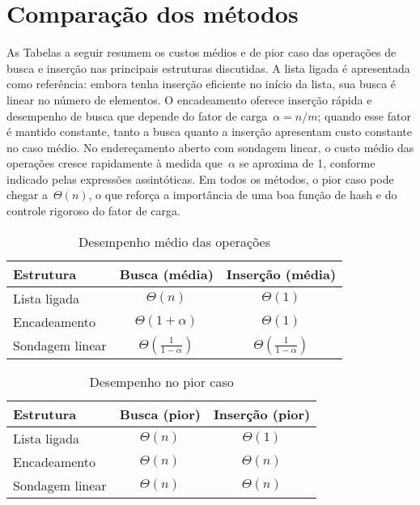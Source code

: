 \section{Comparação dos métodos}

As Tabelas a seguir resumem os custos médios e de pior caso das operações de busca e inserção nas principais estruturas discutidas. 
A lista ligada é apresentada como referência: embora tenha inserção eficiente no início da lista, sua busca é linear no número de elementos. 
O encadeamento oferece inserção rápida e desempenho de busca que depende do fator de carga~$\alpha = n/m$; quando esse fator é mantido constante, tanto a busca quanto a inserção apresentam custo constante no caso médio. 
No endereçamento aberto com sondagem linear, o custo médio das operações cresce rapidamente à medida que~$\alpha$ se aproxima de 1, conforme indicado pelas expressões assintóticas. 
Em todos os métodos, o pior caso pode chegar a~$\Theta(n)$, o que reforça a importância de uma boa função de hash e do controle rigoroso do fator de carga.

\begin{table}[h!]
\centering
\caption{Desempenho médio das operações}
\begin{tabular}{|l|c|c|}
\hline
\textbf{Estrutura} & \textbf{Busca (média)} & \textbf{Inserção (média)} \\
\hline
Lista ligada        & $\Theta(n)$ & $\Theta(1)$ \\
Encadeamento        & $\Theta(1 + \alpha)$ & $\Theta(1)$ \\
Sondagem linear     & $\Theta\left( \frac{1}{1 - \alpha} \right)$ & $\Theta\left( \frac{1}{1 - \alpha} \right)$ \\
\hline
\end{tabular}
\end{table}


\begin{table}[h!]
\centering
\caption{Desempenho no pior caso}
\begin{tabular}{|l|c|c|}
\hline
\textbf{Estrutura} & \textbf{Busca (pior)} & \textbf{Inserção (pior)} \\
\hline
Lista ligada        & $\Theta(n)$ & $\Theta(1)$ \\
Encadeamento        & $\Theta(n)$ & $\Theta(n)$ \\
Sondagem linear     & $\Theta(n)$ & $\Theta(n)$ \\
\hline
\end{tabular}
\end{table}
